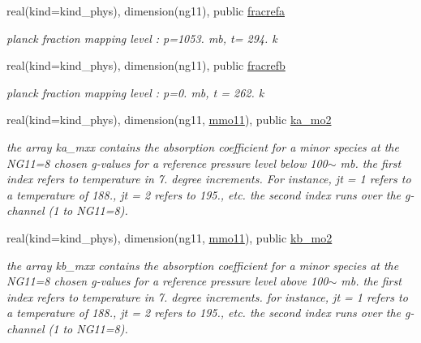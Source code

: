 \begin{Indent}
\begin{DoxyCompactItemize}
real(kind=kind\+\_\+phys), dimension(ng11), public \hyperlink{group__module__radlw__kgbnn_ga5bf6552fb9c1e7c35729b2aea885306e}{fracrefa}
\begin{DoxyCompactList}\small\item\em planck fraction mapping level \+: p=1053. mb, t= 294. k \end{DoxyCompactList}\item 
real(kind=kind\+\_\+phys), dimension(ng11), public \hyperlink{group__module__radlw__kgbnn_ga0a89a2686ebc70a2c0d8577b89384a56}{fracrefb}
\begin{DoxyCompactList}\small\item\em planck fraction mapping level \+: p=0. mb, t = 262. k \end{DoxyCompactList}\item 
real(kind=kind\+\_\+phys), dimension(ng11, \hyperlink{group__module__radlw__kgbnn_ga6aabd24aa785ef8689c63b01aaaab243}{mmo11}), public \hyperlink{group__module__radlw__kgbnn_ga8791eb290525c0d08fefa33ca23569c8}{ka\+\_\+mo2}
\begin{DoxyCompactList}\small\item\em the array ka\+\_\+mxx contains the absorption coefficient for a minor species at the N\+G11=8 chosen g-\/values for a reference pressure level below 100$\sim$ mb. the first index refers to temperature in 7. degree increments. For instance, jt = 1 refers to a temperature of 188., jt = 2 refers to 195., etc. the second index runs over the g-\/channel (1 to N\+G11=8). \end{DoxyCompactList}\item 
real(kind=kind\+\_\+phys), dimension(ng11, \hyperlink{group__module__radlw__kgbnn_ga6aabd24aa785ef8689c63b01aaaab243}{mmo11}), public \hyperlink{group__module__radlw__kgbnn_gaebc48e152bb90794b6d0b426f6c5f9e4}{kb\+\_\+mo2}
\begin{DoxyCompactList}\small\item\em the array kb\+\_\+mxx contains the absorption coefficient for a minor species at the N\+G11=8 chosen g-\/values for a reference pressure level above 100$\sim$ mb. the first index refers to temperature in 7. degree increments. for instance, jt = 1 refers to a temperature of 188., jt = 2 refers to 195., etc. the second index runs over the g-\/channel (1 to N\+G11=8). \end{DoxyCompactList}\end{DoxyCompactItemize}
\end{Indent}
